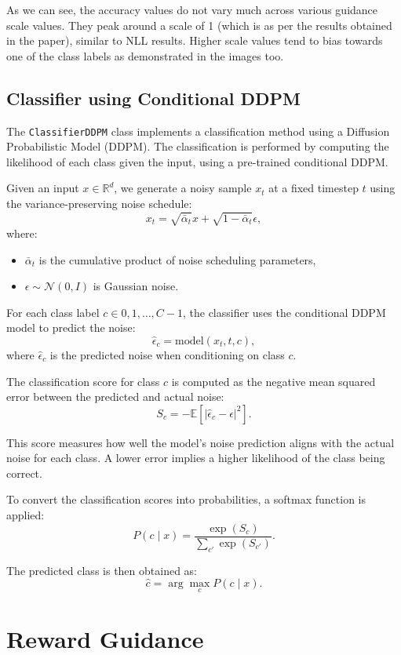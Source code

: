 \documentclass[a4paper,12pt]{article}
\begin{document}
As we can see, the accuracy values do not vary much across various guidance scale values. They peak around a scale of 1 (which is as per the results obtained in the paper), similar to NLL results. Higher scale values tend to bias towards one of the class labels as demonstrated in the images too. 




\subsection*{Classifier using Conditional DDPM}

The \texttt{ClassifierDDPM} class implements a classification method using a Diffusion Probabilistic Model (DDPM). The classification is performed by computing the likelihood of each class given the input, using a pre-trained conditional DDPM.

Given an input $x \in \mathbb{R}^d$, we generate a noisy sample $x_t$ at a fixed timestep $t$ using the variance-preserving noise schedule:
\begin{equation}
x_t = \sqrt{\bar{\alpha}_t} x + \sqrt{1 - \bar{\alpha}_t} \epsilon,
\end{equation}
where:
\begin{itemize}
\item $\bar{\alpha}_t$ is the cumulative product of noise scheduling parameters,
\item $\epsilon \sim \mathcal{N}(0, I)$ is Gaussian noise.
\end{itemize}


For each class label $c \in {0, 1, \dots, C-1}$, the classifier uses the conditional DDPM model to predict the noise:
\begin{equation}
\hat{\epsilon}_c = \text{model}(x_t, t, c),
\end{equation}
where $\hat{\epsilon}_c$ is the predicted noise when conditioning on class $c$.

The classification score for class $c$ is computed as the negative mean squared error between the predicted and actual noise:
\begin{equation}
S_c = -\mathbb{E} \left[ | \hat{\epsilon}_c - \epsilon |^2 \right].
\end{equation}

This score measures how well the model’s noise prediction aligns with the actual noise for each class. A lower error implies a higher likelihood of the class being correct.

To convert the classification scores into probabilities, a softmax function is applied:
\begin{equation}
P(c \mid x) = \frac{\exp(S_c)}{\sum_{c'} \exp(S_{c'})}.
\end{equation}

The predicted class is then obtained as:
\begin{equation}
\hat{c} = \arg\max_c P(c \mid x).
\end{equation}





\clearpage
\section*{Reward Guidance}
\end{document}
